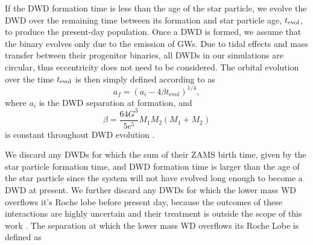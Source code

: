 \documentclass[twocolumn]{aastex631}
\begin{document}




If the DWD formation time is less than the age of the star particle, we evolve the DWD over the remaining time between its formation and star particle age, $t_{\rm{evol}}$, to produce the present-day population. Once a DWD is formed, we assume that the binary evolves only due to the emission of GWs. Due to tidal effects and mass transfer between their progenitor binaries, all DWDs in our simulations are circular, thus eccentricity does not need to be considered. The orbital evolution over the time $t_{\rm{evol}}$ is then simply defined according to \citet{Peters1964} as
\begin{equation}
    a_f = (a_i - 4\beta t_\text{evol})^{1/4},
\end{equation}
where $a_i$ is the DWD separation at formation, and 
\begin{equation}
    \beta = \frac{64G^3}{5c^5} M_1M_2(M_1+M_2)
\end{equation}
is constant throughout DWD evolution \citep{Peters1964}.

We discard any DWDs for which the sum of their ZAMS birth time, given by the star particle formation time, and DWD formation time is larger than the age of the star particle since the system will not have evolved long enough to become a DWD at present. We further discard any DWDs for which the lower mass WD overflows it's Roche lobe before present day, because the outcomes of these interactions are highly uncertain and their treatment is outside the scope of this work \citep[e.g., ][]{Shen2015, Kremer2017}. The separation at which the lower mass WD overflows its Roche Lobe is defined as
\end{document}

